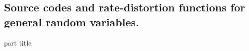 
\subsection{Source codes and rate-distortion functions for general random variables.}
\begin{frame}
 \vspace{12.0ex}
\begin{center}
\begin{beamercolorbox}[sep=12pt,center]{part title}
\insertsubsection\par
\end{beamercolorbox}
\end{center}
\end{frame}


